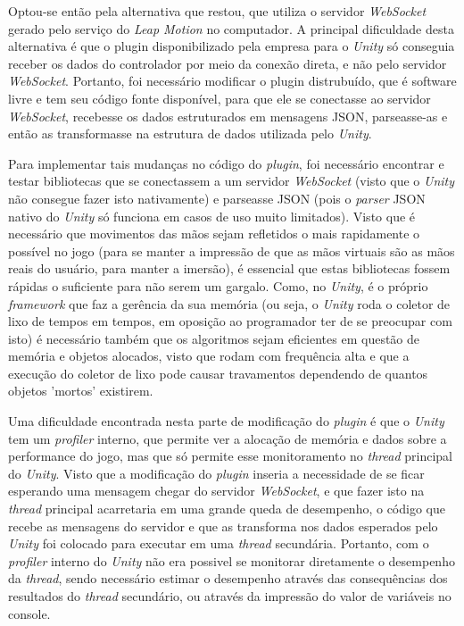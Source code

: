Optou-se então pela alternativa que restou, que utiliza o servidor
\textit{WebSocket} gerado pelo serviço do \textit{Leap Motion} no computador. 
A principal dificuldade desta alternativa é que o plugin disponibilizado 
pela empresa para o \textit{Unity} só conseguia receber os dados do controlador 
por meio da conexão direta, e não pelo servidor \textit{WebSocket}. Portanto, foi 
necessário modificar o plugin distrubuído, que é software livre e tem seu 
código fonte disponível, para que ele se conectasse ao servidor \textit{WebSocket}, 
recebesse os dados estruturados em mensagens JSON, parseasse-as e 
então as transformasse na estrutura de dados utilizada pelo \textit{Unity}.

Para implementar tais mudanças no código do \textit{plugin}, foi necessário encontrar 
e testar bibliotecas que se conectassem a um servidor
\textit{WebSocket} (visto que o \textit{Unity} não consegue fazer 
isto nativamente) e parseasse JSON (pois o \textit{parser} JSON nativo 
do \textit{Unity} só funciona em casos de uso muito limitados). Visto que 
é necessário que movimentos das mãos sejam refletidos o mais rapidamente 
o possível no jogo (para se manter a impressão de que as mãos virtuais 
são as mãos reais do usuário, para manter a imersão), é essencial que 
estas bibliotecas fossem rápidas o suficiente para não serem um gargalo. 
Como, no \textit{Unity}, é o próprio \textit{framework}
que faz a gerência da sua memória (ou seja, o \textit{Unity} roda o coletor de 
lixo de tempos em tempos, em oposição ao programador ter de se preocupar com isto)
é necessário também que os algoritmos sejam eficientes em questão de memória 
e objetos alocados, visto que rodam com frequência alta e que a execução do
coletor de lixo pode causar travamentos dependendo de quantos objetos 'mortos' 
existirem.

Uma dificuldade encontrada nesta parte de modificação do \textit{plugin} é que o
\textit{Unity} tem um \textit{profiler} interno, que permite ver a alocação
de memória e dados sobre a performance do jogo, mas que só permite esse
monitoramento no \textit{thread} principal do \textit{Unity}. Visto que a 
modificação do \textit{plugin} inseria a necessidade de se ficar esperando uma 
mensagem chegar do servidor \textit{WebSocket}, e que fazer isto na 
\textit{thread} principal acarretaria em uma grande queda de desempenho, 
o código que recebe as mensagens do servidor e que as transforma nos dados
esperados pelo \textit{Unity} foi colocado para executar em uma \textit{thread}
secundária. Portanto, com o \textit{profiler} interno do \textit{Unity} não
era possivel se monitorar diretamente o desempenho da \textit{thread}, sendo 
necessário estimar o desempenho através das consequências dos resultados do 
\textit{thread} secundário, ou através da impressão do valor de variáveis
no console.


